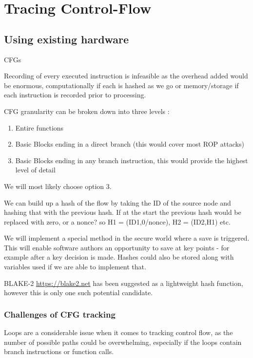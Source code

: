 \section{Tracing Control-Flow}

\subsection{Using existing hardware}

CFGs 

Recording of every executed instruction is infeasible as the overhead added would be enormous, computationally if each is hashed as we go or memory/storage if each instruction is recorded prior to processing.

CFG granularity can be broken down into three levels \cite{Abera2016}:
\begin{enumerate}
	\item{Entire functions}
	\item{Basic Blocks ending in a direct branch (this would cover most ROP attacks)}
	\item{Basic Blocks ending in any branch instruction, this would provide the highest level of detail}
\end{enumerate}

We will most likely choose option 3.

We can build up a hash of the flow by taking the ID of the source node and hashing that with the previous hash. If at the start the previous hash would be replaced with zero, or a nonce? so H1 = (ID1,0/nonce), H2 = (ID2,H1) etc.

We will implement a special method in the secure world where a save is triggered. This will enable software authors an opportunity to save at key points - for example after a key decision is made. Hashes could also be stored along with variables used if we are able to implement that.

BLAKE-2 \url{https://blake2.net} has been suggested as a lightweight hash function, however this is only one such potential candidate.

\subsubsection{Challenges of CFG tracking}

Loops are a considerable issue when it comes to tracking control flow, as the number of possible paths could be overwhelming, especially if the loops contain branch instructions or function calls.

